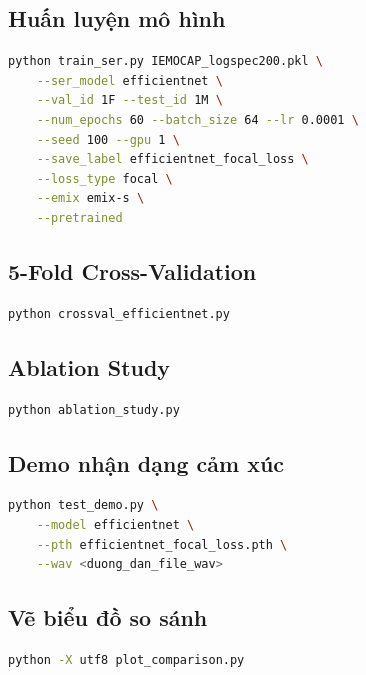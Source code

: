 \subsection{Huấn luyện mô hình}

\begin{lstlisting}[language=bash, caption={Lệnh huấn luyện EfficientNet-B0 (mô hình tốt nhất)}]
python train_ser.py IEMOCAP_logspec200.pkl \
    --ser_model efficientnet \
    --val_id 1F --test_id 1M \
    --num_epochs 60 --batch_size 64 --lr 0.0001 \
    --seed 100 --gpu 1 \
    --save_label efficientnet_focal_loss \
    --loss_type focal \
    --emix emix-s \
    --pretrained
\end{lstlisting}

\subsection{5-Fold Cross-Validation}

\begin{lstlisting}[language=bash, caption={Chạy 5-Fold Cross-Validation}]
python crossval_efficientnet.py
\end{lstlisting}

\subsection{Ablation Study}

\begin{lstlisting}[language=bash, caption={Chạy Ablation Study}]
python ablation_study.py
\end{lstlisting}

\subsection{Demo nhận dạng cảm xúc}

\begin{lstlisting}[language=bash, caption={Demo nhận dạng cảm xúc từ file .wav}]
python test_demo.py \
    --model efficientnet \
    --pth efficientnet_focal_loss.pth \
    --wav <duong_dan_file_wav>
\end{lstlisting}

\subsection{Vẽ biểu đồ so sánh}

\begin{lstlisting}[language=bash, caption={Tạo biểu đồ so sánh tổng hợp}]
python -X utf8 plot_comparison.py
\end{lstlisting}

